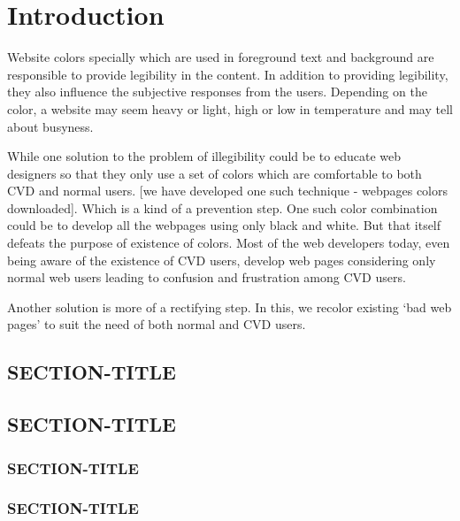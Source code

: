\chapter{Introduction}
\thispagestyle{plain}

\label{Introduction}
Website colors specially which are used in foreground text and background are responsible to provide legibility in the content. In addition to providing legibility, they also influence the subjective responses from the users. Depending on the color, a website may seem heavy or light, high or low in temperature and may tell about busyness.

While one solution to the problem of illegibility could be to educate web designers so that they only use a set of colors which are comfortable to both CVD and normal users. [we have developed one such technique - webpages colors downloaded]. Which is a kind of a prevention step. One such color combination could be to develop all the webpages using only black and white. But that itself defeats the purpose of existence of colors. Most of the web developers today, even being aware of the existence of CVD users, develop web pages considering only normal web users leading to confusion and frustration among CVD users.

Another solution is more of a rectifying step. In this, we recolor existing ‘bad web pages’ to suit the need of both normal and CVD users.
\section{SECTION-TITLE}
\label{SECTION-LABEL}

\section{SECTION-TITLE}
\label{SECTION-LABEL}

\subsection{SECTION-TITLE}
\label{SECTION-LABEL}

\subsection{SECTION-TITLE}
\label{SECTION-LABEL}